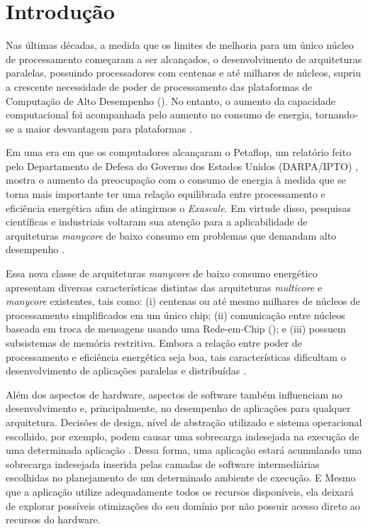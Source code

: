 \documentclass[
	12pt,				%
	openright,			%
	twoside,			%
	a4paper,			%
	english,			%
	brazil,				%
	]{abntex2}
\begin{document}
\chapter{Introdução}
\label{cap:introducao}

    Nas últimas décadas, a medida que os limites de melhoria para um único núcleo de processamento começaram a ser alcançados, o desenvolvimento de arquiteturas paralelas, possuindo processadores com centenas e até milhares de núcleos, supriu a crescente necessidade de poder de processamento das plataformas de Computação de Alto Desempenho (\hpc).
    No entanto, o aumento da capacidade computacional foi acompanhada pelo aumento no consumo de energia, tornando-se a maior desvantagem para plataformas \hpc.
    
    Em uma era em que os computadores alcançaram o Petaflop, um relatório feito pelo Departamento de Defesa do Governo dos Estados Unidos (DARPA/IPTO) \cite{darpa:exascale}, mostra o aumento da preocupação com o consumo de energia à medida que se torna mais importante ter uma relação equilibrada entre processamento e eficiência energética afim de atingirmos o \textit{Exascale}. Em virtude disso, pesquisas científicas e industriais voltaram sua atenção para a aplicabilidade de arquiteturas \textit{manycore} de baixo consumo em problemas que demandam alto desempenho \cite{Castro-SBAC-PAD:2014, Castro-PARCO:2016}.
    
    Essa nova classe de arquiteturas \textit{manycore} de baixo consumo energético apresentam diversas características distintas das arquiteturas \textit{multicore} e \textit{manycore} existentes, tais como: (i) centenas ou até mesmo milhares de núcleos de processamento simplificados em um único chip; (ii) comunicação entre núcleos baseada em troca de mensagens usando uma Rede-em-Chip (\noc); e (iii) possuem subsistemas de memória restritiva.
    Embora a relação entre poder de processamento e eficiência energética seja boa, tais características dificultam o desenvolvimento de aplicações paralelas e distribuídas \cite{Castro-Souza-CCPE:2016, Castro-PARCO:2016, os:rmen}.
    
    Além dos aspectos de hardware, aspectos de software também influenciam no desenvolvimento e, principalmente, no desempenho de aplicações para qualquer arquitetura.
    Decisões de design, nível de abstração utilizado e sistema operacional escolhido, por exemplo, podem causar uma sobrecarga indesejada na execução de uma determinada aplicação \cite{Appel:1991:VMP:106972.106984, Cao:1994:IPA:1267638.1267651, Harty:1992:APM:143365.143511, Krueger:1993:TDA:165854.165867, Stonebraker:1981:OSS:358699.358703, Levy:Exception, hunt_singularity:_2007}.
    Dessa forma, uma aplicação estará acumulando uma sobrecarga indesejada inserida pelas camadas de software intermediárias escolhidas no planejamento de um determinado ambiente de execução.
    E Mesmo que a aplicação utilize adequadamente todos os recursos disponíveis, ela deixará de explorar possíveis otimizações do seu domínio por não possuir acesso direto ao recursos do hardware.
    
\end{document}
